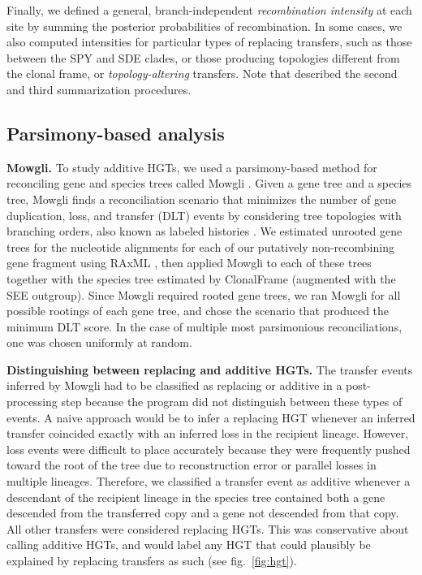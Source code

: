 \documentclass[12pt]{article}
\begin{document}
Finally, we defined a general, branch-independent
 {\em recombination intensity} at each site by 
summing the posterior probabilities of recombination.
In some cases, we also computed intensities for particular types of
replacing transfers, such as 
those between the SPY and SDE clades, or those producing topologies
different from the clonal frame, or \textit{topology-altering} transfers.  
Note that \cite{Didelot2010} described the second and third summarization
procedures. 

\subsection*{Parsimony-based analysis}


{\bf Mowgli.} To study additive HGTs, we used a parsimony-based method
for reconciling gene and species trees called Mowgli \citep{Doyon2011}.
Given a gene tree and a species tree, Mowgli finds a reconciliation scenario 
that minimizes the number of gene duplication, loss, and
transfer (DLT) events by considering tree topologies with branching orders, also
known as labeled histories \citep{Edwards1970}.  We estimated
unrooted gene trees for the nucleotide alignments for each of our
putatively non-recombining gene fragment using RAxML \citep{Stamatakis2006},
then applied Mowgli to each of these trees together with the species
tree estimated by ClonalFrame (augmented with the SEE outgroup).
Since Mowgli required rooted gene trees, we ran Mowgli for all possible
rootings of each gene tree, and chose the scenario that produced the
minimum DLT score. In the case of multiple most parsimonious
reconciliations, one was chosen uniformly at random.

{\bf Distinguishing between replacing and additive HGTs.}  The transfer
events inferred by Mowgli had to be classified as replacing or
additive in a post-processing step because the program did not
distinguish between these types of events.  A naive approach 
would be to infer a replacing HGT whenever an inferred transfer
coincided exactly with an inferred loss in the recipient lineage.  However,
loss events were difficult to place accurately because they were frequently
pushed toward the root of the tree due to reconstruction error or parallel
losses in multiple lineages.  Therefore, we classified a transfer event as
additive whenever a descendant of the recipient lineage in the species tree
contained both a gene descended from the transferred copy and a gene not
descended from that copy.  All other transfers were considered replacing
HGTs.  This was conservative about calling additive HGTs, and would
label any HGT that could plausibly be explained by replacing transfers
as such (see fig.\ \ref{fig:hgt}).
\end{document}
